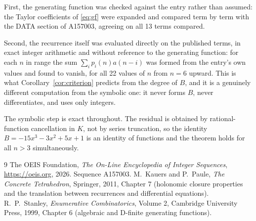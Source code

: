 \documentclass[11pt,a4paper]{article}
\theoremstyle{plain}
\theoremstyle{definition}
\begin{document}
First, the generating function was checked against the entry rather than assumed: the
Taylor coefficients of \eqref{eq:gf} were expanded and compared term by term with the DATA
section of A157003, agreeing on all 13 terms compared.

Second, the recurrence itself was evaluated directly on the published terms, in exact
integer arithmetic and without reference to the generating function: for each $n$ in range
the sum $\sum_{i}p_{i}(n)a(n-i)$ was formed from the entry's own values and found to
vanish, for all 22 values of $n$ from $n=6$ upward. This is what
Corollary~\ref{cor:criterion} predicts from the degree of $B$, and it is a genuinely
different computation from the symbolic one: it never forms $B$, never differentiates, and
uses only integers.

The symbolic step is exact throughout. The residual is obtained by rational-function
cancellation in $K$, not by series truncation, so the identity $B=- 15 x^{3} - 3 x^{2} + 5 x + 1$ is an
identity of functions and the theorem holds for all $n>3$ simultaneously.

\begin{thebibliography}{9}
 The OEIS Foundation, \emph{The On-Line Encyclopedia of Integer Sequences},
\url{https://oeis.org}, 2026. Sequence A157003.
 M.~Kauers and P.~Paule, \emph{The Concrete Tetrahedron}, Springer, 2011,
Chapter 7 (holonomic closure properties and the translation between recurrences and
differential equations).
 R.~P.~Stanley, \emph{Enumerative Combinatorics}, Volume 2, Cambridge
University Press, 1999, Chapter 6 (algebraic and D-finite generating functions).
\end{thebibliography}
\end{document}
